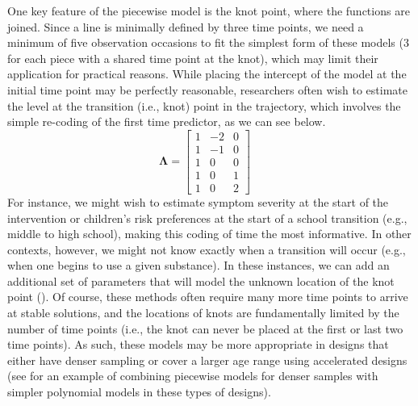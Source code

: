 \documentclass[11pt]{article}
\begin{document}
One key feature of the piecewise model is the knot point, where the functions are joined. Since a line is minimally defined by three time points, we need a minimum of five observation occasions to fit the simplest form of these models (3 for each piece with a shared time point at the knot), which may limit their application for practical reasons. While placing the intercept of the model at the initial time point may be perfectly reasonable, researchers often wish to estimate the level at the transition (i.e., knot) point in the trajectory, which involves the simple re-coding of the first time predictor, as we can see below.
%
\begin{equation} \label{eq:20}
\boldsymbol{\Lambda} = \left[ \begin{array}{cccc} 1 & -2 & 0 \\ 1 & -1 & 0 \\ 1 & 0 & 0 \\ 1 & 0 & 1 \\ 1 & 0 & 2 \end{array} \right] \quad
\end{equation}
%
For instance, we might wish to estimate symptom severity at the start of the intervention or children's risk preferences at the start of a school transition (e.g., middle to high school), making this coding of time the most informative. In other contexts, however, we might not know exactly when a transition will occur (e.g., when one begins to use a given substance). In these instances, we can add an additional set of parameters that will model the unknown location of the knot point (\cite{cudeck_multiphase_2002,kohli_piecewise_2013}). Of course, these methods often require many more time points to arrive at stable solutions, and the locations of knots are fundamentally limited by the number of time points (i.e., the knot can never be placed at the first or last two time points). As such, these models may be more appropriate in designs that either have denser sampling or cover a larger age range using accelerated designs (see \cite{mccormick_longitudinal_2021} for an example of combining piecewise models for denser samples with simpler polynomial models in these types of designs).
\end{document}
